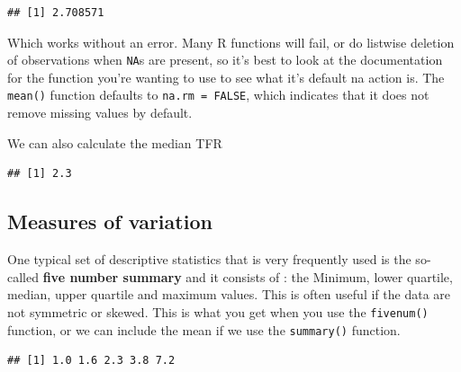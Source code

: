 \documentclass[
]{book}
\newenvironment{Shaded}{\begin{snugshade}}{\end{snugshade}}
\newcommand{\AttributeTok}[1]{\textcolor[rgb]{0.77,0.63,0.00}{#1}}
\newcommand{\ConstantTok}[1]{\textcolor[rgb]{0.00,0.00,0.00}{#1}}
\newcommand{\FunctionTok}[1]{\textcolor[rgb]{0.00,0.00,0.00}{#1}}
\newcommand{\NormalTok}[1]{#1}
\newcommand{\SpecialCharTok}[1]{\textcolor[rgb]{0.00,0.00,0.00}{#1}}
\begin{document}
\begin{verbatim}
## [1] 2.708571
\end{verbatim}

Which works without an error. Many R functions will fail, or do listwise
deletion of observations when \texttt{NA}s are present, so it's best to look at
the documentation for the function you're wanting to use to see what
it's default na action is. The \texttt{mean()} function defaults to
\texttt{na.rm\ =\ FALSE}, which indicates that it does not remove missing values
by default.

We can also calculate the median TFR

\begin{Shaded}
\end{Shaded}

\begin{verbatim}
## [1] 2.3
\end{verbatim}

\hypertarget{measures-of-variation}{%
\subsection{Measures of variation}\label{measures-of-variation}}

One typical set of descriptive statistics that is very frequently used
is the so-called \textbf{five number summary} and it consists of : the
Minimum, lower quartile, median, upper quartile and maximum values. This
is often useful if the data are not symmetric or skewed. This is what
you get when you use the \texttt{fivenum()} function, or we can include the
mean if we use the \texttt{summary()} function.

\begin{Shaded}
\end{Shaded}

\begin{verbatim}
## [1] 1.0 1.6 2.3 3.8 7.2
\end{verbatim}

\begin{Shaded}
\end{Shaded}
\end{document}
